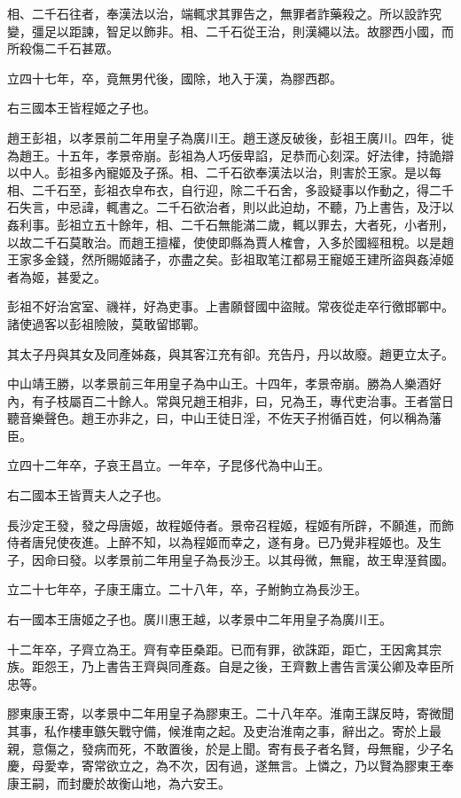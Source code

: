 相、二千石往者，奉漢法以治，端輒求其罪告之，無罪者詐藥殺之。所以設詐究變，彊足以距諫，智足以飾非。相、二千石從王治，則漢繩以法。故膠西小國，而所殺傷二千石甚眾。

立四十七年，卒，竟無男代後，國除，地入于漢，為膠西郡。

右三國本王皆程姬之子也。

趙王彭祖，以孝景前二年用皇子為廣川王。趙王遂反破後，彭祖王廣川。四年，徙為趙王。十五年，孝景帝崩。彭祖為人巧佞卑諂，足恭而心刻深。好法律，持詭辯以中人。彭祖多內寵姬及子孫。相、二千石欲奉漢法以治，則害於王家。是以每相、二千石至，彭祖衣皁布衣，自行迎，除二千石舍，多設疑事以作動之，得二千石失言，中忌諱，輒書之。二千石欲治者，則以此迫劫，不聽，乃上書告，及汙以姦利事。彭祖立五十餘年，相、二千石無能滿二歲，輒以罪去，大者死，小者刑，以故二千石莫敢治。而趙王擅權，使使即縣為賈人榷會，入多於國經租稅。以是趙王家多金錢，然所賜姬諸子，亦盡之矣。彭祖取笔江都易王寵姬王建所盜與姦淖姬者為姬，甚愛之。

彭祖不好治宮室、禨祥，好為吏事。上書願督國中盜賊。常夜從走卒行徼邯鄲中。諸使過客以彭祖險陂，莫敢留邯鄲。

其太子丹與其女及同產姊姦，與其客江充有卻。充告丹，丹以故廢。趙更立太子。

中山靖王勝，以孝景前三年用皇子為中山王。十四年，孝景帝崩。勝為人樂酒好內，有子枝屬百二十餘人。常與兄趙王相非，曰，兄為王，專代吏治事。王者當日聽音樂聲色。趙王亦非之，曰，中山王徒日淫，不佐天子拊循百姓，何以稱為藩臣。

立四十二年卒，子哀王昌立。一年卒，子昆侈代為中山王。

右二國本王皆賈夫人之子也。

長沙定王發，發之母唐姬，故程姬侍者。景帝召程姬，程姬有所辟，不願進，而飾侍者唐兒使夜進。上醉不知，以為程姬而幸之，遂有身。已乃覺非程姬也。及生子，因命曰發。以孝景前二年用皇子為長沙王。以其母微，無寵，故王卑溼貧國。

立二十七年卒，子康王庸立。二十八年，卒，子鮒鮈立為長沙王。

右一國本王唐姬之子也。廣川惠王越，以孝景中二年用皇子為廣川王。

十二年卒，子齊立為王。齊有幸臣桑距。已而有罪，欲誅距，距亡，王因禽其宗族。距怨王，乃上書告王齊與同產姦。自是之後，王齊數上書告言漢公卿及幸臣所忠等。

膠東康王寄，以孝景中二年用皇子為膠東王。二十八年卒。淮南王謀反時，寄微聞其事，私作樓車鏃矢戰守備，候淮南之起。及吏治淮南之事，辭出之。寄於上最親，意傷之，發病而死，不敢置後，於是上聞。寄有長子者名賢，母無寵，少子名慶，母愛幸，寄常欲立之，為不次，因有過，遂無言。上憐之，乃以賢為膠東王奉康王嗣，而封慶於故衡山地，為六安王。

